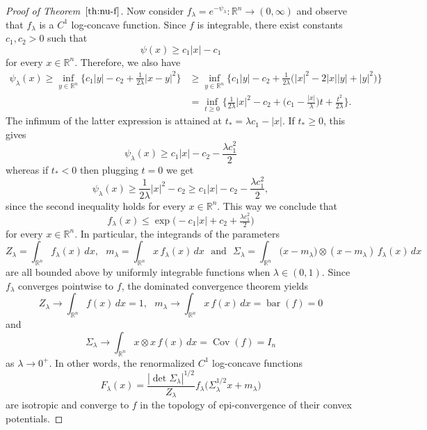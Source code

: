 \documentclass[11pt,leqno]{article}
\theoremstyle{definition}
\theoremstyle{remark}
\numberwithin{equation}{section}
\newcommand{\ls}{\leqslant}
\newcommand{\gr}{\geqslant}
\newcommand{\1}{\textbf{1}}
\newcommand{\R}{\mathbb{R}}
\begin{document}
\begin{proof}[Proof of Theorem~$\ref{th:nu-f}$]
Now consider $f_\lambda = e^{-\psi_\lambda}:\R^n \to(0,\infty)$ and observe that $f_\lambda$ is a $C^1$ log-concave function. Since $f$ is integrable, there exist constants $c_1, c_2 >0$ such that
$$\psi(x) \gr c_1 |x| - c_1$$
for every $x\in\R^n$. Therefore, we also have
\begin{equation*}
\begin{split}
\psi_\lambda(x)  \gr \inf_{y\in\R^n} \Big\{ c_1 |y| -c_2 + \frac{1}{2\lambda} |x-y|^2 \Big\} & \gr \inf_{y\in\R^n} \Big\{ c_1|y|-c_2 + \frac{1}{2\lambda}\big( |x|^2 - 2 |x||y| + |y|^2 \big)\Big\} \\ 
& = \inf_{t\gr0} \Big\{ \frac{1}{2\lambda}|x|^2 - c_2 + \Big(c_1-\frac{|x|}{\lambda}\Big)t + \frac{t^2}{2\lambda}\Big\}.
\end{split}
\end{equation*}
The infimum of the latter expression is attained at $t_\ast = \lambda c_1-|x|$. If $t_\ast\gr0$, this gives
$$\psi_\lambda(x) \gr c_1|x| - c_2 - \frac{\lambda c_1^2}{2}$$
whereas if $t_\ast<0$ then plugging $t=0$ we get
$$\psi_\lambda(x) \gr \frac{1}{2\lambda}|x|^2 - c_2 \gr c_1|x| - c_2 -\frac{\lambda c_1^2}{2},$$
since the second inequality holds for every $x\in \R^n$. This way we conclude that
$$f_\lambda(x) \ls \exp\big(-c_1|x|+c_2+\tfrac{\lambda c_1^2}{2}\big)$$
for every $x\in \R^n$. In particular, the integrands of the parameters
$$Z_\lambda = \int_{\R^n} f_\lambda(x)\, dx , \ \ \ m_\lambda = \int_{\R^n} x \, f_\lambda(x)\, dx \ \ \ \mbox{and} \ \ \ \Sigma_\lambda = \int_{\R^n} \big(x - m_\lambda) \otimes (x-m_\lambda)\, f_\lambda(x)\, dx$$
are all bounded above by uniformly integrable functions when $\lambda\in(0,1)$. Since $f_\lambda$ converges pointwise to $f$, the dominated convergence theorem yields
$$Z_\lambda \longrightarrow \int_{\R^n} f(x)\, dx = 1, \ \ \ m_\lambda \longrightarrow \int_{\R^n} x\, f(x)\, dx = \operatorname{bar}(f) = 0$$
and
$$\Sigma_\lambda \longrightarrow \int_{\R^n} x\otimes x \, f(x)\, dx = \operatorname{Cov}(f)= I_n$$
as $\lambda\to0^+$. In other words, the renormalized $C^1$ log-concave functions
$$F_\lambda(x) = \frac{|\det \Sigma_\lambda|^{1/2}}{Z_\lambda} f_\lambda\big(\Sigma_\lambda^{1/2}x+m_\lambda\big)$$
are isotropic and converge to $f$ in the topology of epi-convergence of their convex potentials.


\end{proof}
\end{document}
